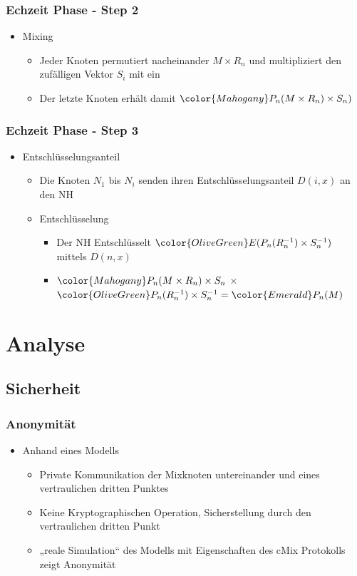 \documentclass[t, xcolor=dvipsnames]{beamer}
\begin{document}
\begin{frame}
	\frametitle{Echzeit Phase - Step 2}
	\begin{itemize}
		\item Mixing
		\begin{itemize}
			\item Jeder Knoten permutiert nacheinander $M \times R_n$ und multipliziert den zufälligen Vektor $S_i$ mit ein
			\item Der letzte Knoten erhält damit $\color{Mahogany}P_n(M \times R_n) \times S_n)$
		\end{itemize}
	\end{itemize}
	\vspace{\fill}
\end{frame}

\begin{frame}
	\frametitle{Echzeit Phase - Step 3}
	\begin{itemize}
		\item Entschlüsselungsanteil
			\begin{itemize}
				\item Die Knoten $N_1$ bis $N_{i}$ senden ihren Entschlüsselungsanteil $D(i,x)$ an den NH
				
		\item Entschlüsselung
		\begin{itemize}
				\item Der NH Entschlüsselt $\color{OliveGreen} E(P_n(R_n^{-1}) \times S_n^{-1})$ mittels $D(n,x)$
				\item $\color{Mahogany}P_n(M \times R_n) \times S_n$ $\times$ $\color{OliveGreen}P_n(R_n^{-1}) \times S_n^{-1} = \color{Emerald} P_n(M)$
			\end{itemize}
		\end{itemize}
	\end{itemize}
	\vspace{\fill}
\end{frame}


\section{Analyse}
\subsection{Sicherheit}
\begin{frame}
	\frametitle{Anonymität}
	\begin{itemize}
		\item Anhand eines Modells
			\begin{itemize}
				\item Private Kommunikation der Mixknoten untereinander und eines vertraulichen dritten Punktes
				\item Keine Kryptographischen Operation, Sicherstellung durch den vertraulichen dritten Punkt
				\item „reale Simulation“ des Modells mit Eigenschaften des cMix Protokolls zeigt Anonymität
			\end{itemize}
	\end{itemize}
	\vspace{\fill}
\end{frame}
\end{document}
